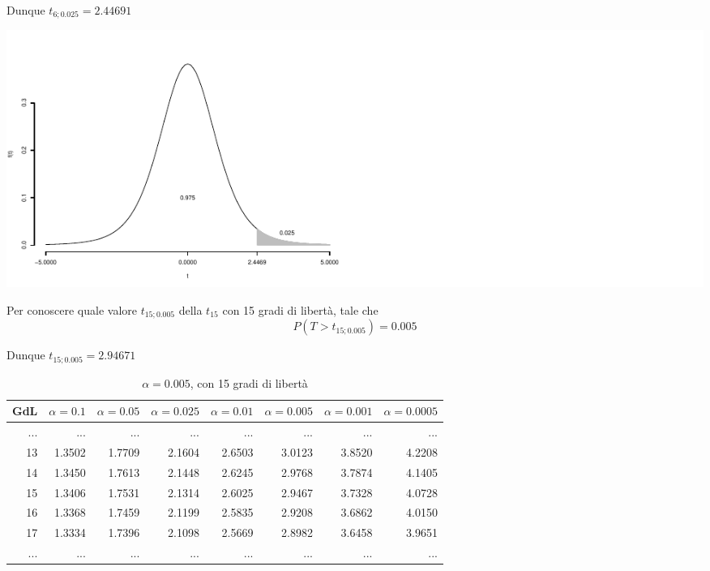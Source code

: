 \documentclass[
  11pt,
]{book}
\theoremstyle{mytheoremstyle}
\theoremstyle{mydefstyle}
\begin{document}
Dunque \(t_{6;0.025}=2.44691\)

\begin{center}\includegraphics{Appunti_di_Statistica_2025_files/figure-latex/09-Statistiche-Campionarie_1-1} \end{center}

Per conoscere quale valore \(t_{15;0.005}\) della \(t_{15}\) con 15 gradi di libertà, tale che
\[P(T>t_{15;0.005})=0.005\]

Dunque \(t_{15;0.005}=2.94671\)

\begin{table}
\centering
\caption{\label{tab:09-Statistiche-Campionarie-6}$\alpha=0.005$, con 15 gradi di libertà}
\centering
\fontsize{7}{9}\selectfont
\begin{tabular}[t]{rrrrr|>{}r|rr}
\toprule
GdL & $\alpha=0.1$ & $\alpha=0.05$ & $\alpha=0.025$ & $\alpha=0.01$ & $\alpha=0.005$ & $\alpha=0.001$ & $\alpha=0.0005$\\
\midrule
... & ... & ... & ... & ... & \textcolor[HTML]{AB292E}{...} & ... & \vphantom{1} ...\\
13 & 1.3502 & 1.7709 & 2.1604 & 2.6503 & \textcolor[HTML]{AB292E}{3.0123} & 3.8520 & 4.2208\\
14 & 1.3450 & 1.7613 & 2.1448 & 2.6245 & \textcolor[HTML]{AB292E}{2.9768} & 3.7874 & 4.1405\\
\midrule
\textcolor[HTML]{AB292E}{15} & \textcolor[HTML]{AB292E}{1.3406} & \textcolor[HTML]{AB292E}{1.7531} & \textcolor[HTML]{AB292E}{2.1314} & \textcolor[HTML]{AB292E}{2.6025} & \textcolor[HTML]{AB292E}{2.9467} & \textcolor[HTML]{AB292E}{3.7328} & \textcolor[HTML]{AB292E}{4.0728}\\
\midrule
16 & 1.3368 & 1.7459 & 2.1199 & 2.5835 & \textcolor[HTML]{AB292E}{2.9208} & 3.6862 & 4.0150\\
17 & 1.3334 & 1.7396 & 2.1098 & 2.5669 & \textcolor[HTML]{AB292E}{2.8982} & 3.6458 & 3.9651\\
... & ... & ... & ... & ... & \textcolor[HTML]{AB292E}{...} & ... & ...\\
\bottomrule
\end{tabular}
\end{table}
\end{document}

